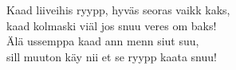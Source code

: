 
            Kaad liiveihis ryypp, hyväs seoras vaikk kaks, \\
            kaad kolmaski viäl jos snuu veres om baks! \\
            Älä ussemppa kaad ann menn siut suu, \\
            sill muuton käy nii et se ryypp kaata snuu! \\
